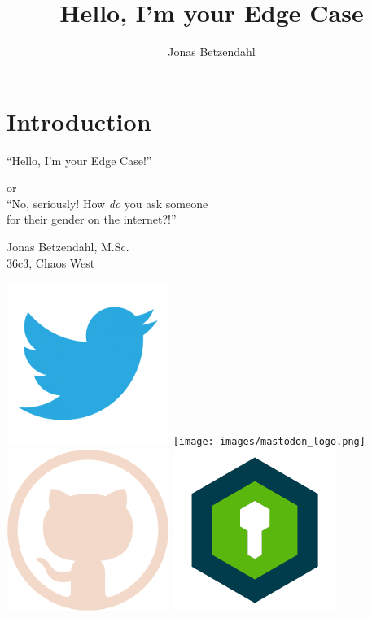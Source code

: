 \documentclass[aspectratio=169,x11names]{beamer}
\author{Jonas Betzendahl}
\title{Hello, I'm your Edge Case}
\begin{document}



\section{Introduction}

\begin{frame}
\begin{center}
\vfill
\huge ``Hello, I'm your Edge Case!''
\normalsize 
\smallskip
\smallskip

or\\
``No, seriously! How \emph{do} you ask someone\\ for their gender on the internet?!''

\bigskip\bigskip

\large Jonas Betzendahl, M.Sc.\\
36c3, Chaos West
\bigskip\bigskip

\href{https://twitter.com/lambdatotoro}{\includegraphics[scale=0.125]{images/twitter_logo.png}}
\href{https://chaos.social/@lambdatotoro}{\texttt{[image: images/mastodon\_logo.png]}}
\href{https://github.com/lambdaTotoro}{\includegraphics[scale=0.125]{images/github_logo.png}}
\href{https://whispeer.de/en/user/jbetzend}{\includegraphics[scale=0.125]{images/whispeer_logo.png}}


\end{center}
\end{frame}
\end{document}
